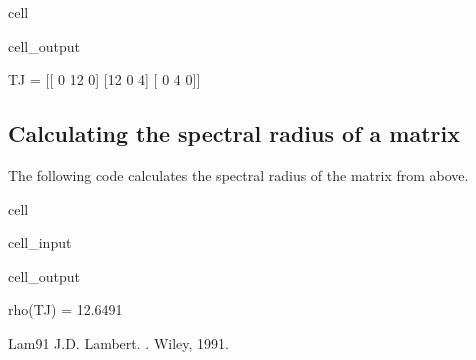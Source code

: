 \documentclass[letterpaper,10pt,english]{jupyterBook}
\begin{document}
\begin{sphinxuseclass}{cell}
\begin{sphinxVerbatimOutput}
\begin{sphinxuseclass}{cell_output}
\begin{sphinxVerbatim}[commandchars=\\\{\}]
TJ = 
[[  0 \PYGZhy{}12   0]
 [\PYGZhy{}12   0   4]
 [  0   4   0]]
\end{sphinxVerbatim}

\end{sphinxuseclass}\end{sphinxVerbatimOutput}

\end{sphinxuseclass}

\subsection{Calculating the spectral radius of a matrix}
\label{\detokenize{8_Appendices/8.1_Python:calculating-the-spectral-radius-of-a-matrix}}
\sphinxAtStartPar
The following code calculates the spectral radius of the matrix  from above.

\begin{sphinxuseclass}{cell}\begin{sphinxVerbatimInput}

\begin{sphinxuseclass}{cell_input}
\begin{sphinxVerbatim}[commandchars=\\\{\}]
  
\end{sphinxVerbatim}

\end{sphinxuseclass}\end{sphinxVerbatimInput}
\begin{sphinxVerbatimOutput}

\begin{sphinxuseclass}{cell_output}
\begin{sphinxVerbatim}[commandchars=\\\{\}]
rho(TJ) = 12.6491
\end{sphinxVerbatim}

\end{sphinxuseclass}\end{sphinxVerbatimOutput}

\end{sphinxuseclass}
\begin{sphinxthebibliography}{Lam91}
\sphinxAtStartPar
J.D. Lambert. . Wiley, 1991.
\end{sphinxthebibliography}







\renewcommand{\indexname}{Index}
\printindex
\end{document}
